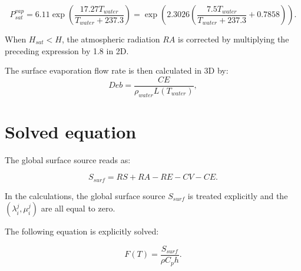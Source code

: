 \begin{equation}
  P_{sat}^{vap} = 6.11 \exp \left( \frac{17.27 T_{water}}{T_{water} + 237.3} \right)
  = \exp \left( 2.3026 \left( \frac{7.5 T_{water}}{T_{water} + 237.3} + 0.7858 \right) \right).
\end{equation}

When $H_{sat} < H$, the atmospheric radiation $RA$ is corrected
by multiplying the preceding expression by 1.8 in 2D.

The surface evaporation flow rate is then calculated in 3D by:
\begin{equation}
Deb = \frac{CE}{\rho_{water}L(T_{water})},
\end{equation}

\section{Solved equation}

The global surface source reads as:

\begin{equation}
  S_{surf} = RS + RA - RE - CV - CE.
\end{equation}


In the calculations, the global surface source $S_{surf}$ is treated explicitly
and the $(\lambda_i^j, \mu_i^j)$ are all equal to zero.

The following equation is explicitly solved:

\begin{equation}
  F(T) = \frac{S_{surf}}{\rho C_p h}.
\end{equation}
